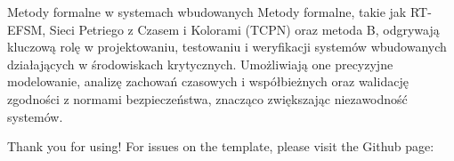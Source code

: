 \documentclass{purdue-poster}
\begin{document}
\begin{frame}{}
\begin{columns}[c]
\begin{column}{.48\linewidth}
    \begin{block}{Metody formalne w systemach wbudowanych}
    Metody formalne, takie jak RT-EFSM, Sieci Petriego z Czasem i Kolorami (TCPN) oraz metoda B, odgrywają kluczową rolę w projektowaniu, 
    testowaniu i weryfikacji systemów wbudowanych działających w środowiskach krytycznych. Umożliwiają one precyzyjne modelowanie, analizę zachowań czasowych i 
    współbieżnych oraz walidację zgodności z normami bezpieczeństwa, znacząco zwiększając niezawodność systemów.
    \end{block}



    

    \begin{block}{Thank you for using!}
        For issues on the template, please visit the Github page:
        

\end{block}
\end{column}
\end{columns}
\end{frame}
\end{document}
